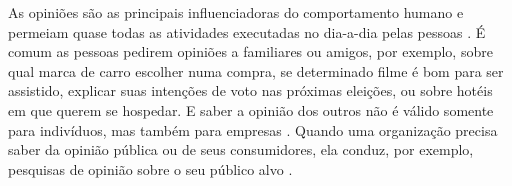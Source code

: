 \documentclass[template.tex]{subfiles}
\begin{document}
%
%

As opiniões são as principais influenciadoras do comportamento humano e permeiam quase todas as atividades executadas no dia-a-dia pelas pessoas \cite{bing:2012}. É comum as pessoas pedirem opiniões a familiares ou amigos, por exemplo, sobre qual marca de carro escolher numa compra, se determinado filme é bom para ser assistido, explicar suas intenções de voto nas próximas eleições, ou sobre hotéis em que querem se hospedar. E saber a opinião dos outros não é válido somente para indivíduos, mas também para empresas \cite{bing:2012, pang:2008}. Quando uma organização precisa saber da opinião pública ou de seus consumidores, ela conduz, por exemplo, pesquisas de opinião sobre o seu público alvo \cite{bing:2012}. 
\end{document}
